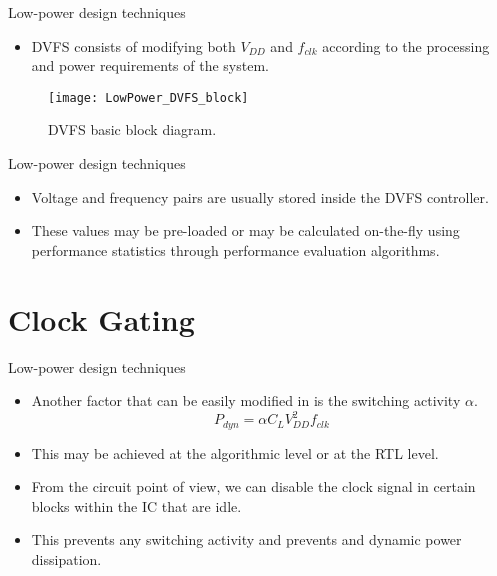 \documentclass[]{slides}
\begin{document}
\begin{frame}{Low-power design techniques}{}
\begin{itemize}
\item \ac{DVFS} consists of modifying both $V_{DD}$ and $f_{clk}$ according to the processing and power requirements of the system.
\end{itemize}
\begin{figure}
\texttt{[image: LowPower\_DVFS\_block]}
\caption{DVFS basic block diagram.}
\label{Figure:DVFS_block}
\end{figure}

\end{frame}

\begin{frame}{Low-power design techniques}{}
\begin{itemize}
\item Voltage and frequency pairs are usually stored inside the \ac{DVFS} controller.
\item These values may be pre-loaded or may be calculated on-the-fly using performance statistics through performance evaluation algorithms.
\end{itemize}
\end{frame}

\section{Clock Gating}
\begin{frame}{Low-power design techniques}{}
\begin{itemize}
\item Another factor that can be easily modified in  is the switching activity $\alpha$.
\begin{equation*}
P_{dyn} = \alpha C_{L} V_{DD}^{2} f_{clk}
\end{equation*}
\item This may be achieved at the algorithmic level or at the \ac{RTL} level.
\item From the circuit point of view, we can disable the clock signal in certain blocks within the \ac{IC} that are idle.\\
\item This prevents any switching activity  and prevents and dynamic power dissipation.
\end{itemize}
\end{frame}
\end{document}

